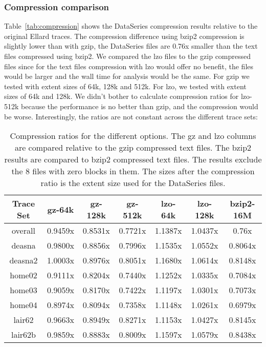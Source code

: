 \documentclass{article}
\begin{document}
\begin{itemize}
\end{itemize}

\subsubsection{Compression comparison}

Table~\ref{tab:compression} shows the DataSeries compression results
relative to the original Ellard traces.  The compression difference
using bzip2 compression is slightly lower than with gzip, the
DataSeries files are 0.76x smaller than the text files compressed
using bzip2.  We compared the lzo files to the gzip compressed files
since for the text files compression with lzo would offer no benefit,
the files would be larger and the wall time for analysis would be the
same.  For gzip we tested with extent sizes of 64k, 128k and 512k.
For lzo, we tested with extent sizes of 64k and 128k.  We didn't
bother to calculate compression ratios for lzo-512k because the
performance is no better than gzip, and the compression would be
worse.  Interestingly, the ratios are not constant across the
different trace sets:

\begin{table}
\begin{tabular}{|c|c|c|c|c|c|c|}\hline
Trace Set & gz-64k  & gz-128k & gz-512k & lzo-64k & lzo-128k & bzip2-16M \\ \hline
overall   & 0.9459x & 0.8531x & 0.7721x & 1.1387x & 1.0437x & 0.76x   \\
deasna    & 0.9800x & 0.8856x & 0.7996x & 1.1535x & 1.0552x & 0.8064x \\
deasna2   & 1.0003x & 0.8976x & 0.8051x & 1.1680x & 1.0614x & 0.8148x \\
home02    & 0.9111x & 0.8204x & 0.7440x & 1.1252x & 1.0335x & 0.7084x \\
home03    & 0.9059x & 0.8170x & 0.7422x & 1.1197x & 1.0301x & 0.7073x \\
home04    & 0.8974x & 0.8094x & 0.7358x & 1.1148x & 1.0261x & 0.6979x \\
lair62    & 0.9663x & 0.8949x & 0.8271x & 1.1153x & 1.0427x & 0.8145x \\
lair62b   & 0.9859x & 0.8883x & 0.8009x & 1.1597x & 1.0579x & 0.8438x \\
\hline
\end{tabular}
\label{table:ellard:compression}

\caption{Compression ratios for the different options.  The gz and lzo
columns are compared relative to the gzip compressed text files.  The
bzip2 results are compared to bzip2 compressed text files.  The
results exclude the 8 files with zero blocks in them.  The sizes after
the compression ratio is the extent size used for the DataSeries files.}

\end{table}
\end{document}
